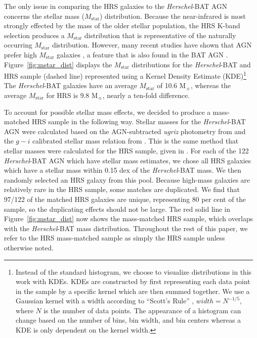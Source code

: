 \documentclass[fleqn, usenatbib]{mnras}
\newcommand{\herschel}{\emph{Herschel}}
\newcommand{\msun}{M$_{\sun}$}
\newcommand{\mstar}{$M_{\mathrm{star}}$}
\begin{document}
The only issue in comparing the HRS galaxies to the \herschel-BAT AGN concerns the stellar mass (\mstar) distribution. Because the near-infrared is most strongly effected by the mass of the older stellar population, the HRS K-band selection produces a \mstar{} distribution that is representative of the naturally occurring \mstar{} distribution. However, many recent studies have shown that AGN prefer high \mstar{} galaxies \citep[e.g.][]{Schawinski:2010zr,Xue:2010fj}, a feature that is also found in the BAT AGN \citep{Koss:2011vn}. Figure~\ref{fig:mstar_dist} displays the \mstar{} distributions for the \herschel-BAT and HRS sample (dashed line) represented using a Kernel Density Estimate (KDE)\footnote{Instead of the standard histogram, we choose to visualize distributions in this work with KDEs. KDEs are constructed by first representing each data point in the sample by a specific kernel which are then summed together. We use a Gaussian kernel with a width according to ``Scott's Rule''  \citep{Scott:1992xy}, $width=N^{-1/5}$, where $N$ is the number of data points. The appearance of a histogram can change based on the number of bins, bin width, and bin centers whereas a KDE is only dependent on the kernel width.} The \herschel-BAT galaxies have an average \mstar{} of 10.6 \msun, whereas the average \mstar{} for HRS is 9.8 \msun, nearly a ten-fold difference. 

To account for possible stellar mass effects, we decided to produce a mass-matched HRS sample in the following way. Stellar masses for the \herschel-BAT AGN were calculated based on the AGN-subtracted \textit{ugriz} photometry from \citet{Koss:2011vn} and the $g-i$ calibrated stellar mass relation from \citet{Zibetti:2009jf}. This is the same method that stellar masses were calculated for the HRS sample, given in \citet{Cortese:2012fj}. For each of the 122 \herschel-BAT AGN which have stellar mass estimates, we chose all HRS galaxies which have a stellar mass within 0.15 dex of the \herschel-BAT mass. We then randomly selected an HRS galaxy from this pool. Because high-mass galaxies are relatively rare in the HRS sample, some matches are duplicated. We find that 97/122 of the matched HRS galaxies are unique, representing 80 per cent of the sample, so the duplicating effects should not be large. The red solid line in Figure~\ref{fig:mstar_dist} now shows the mass-matched HRS sample, which overlaps with the \herschel-BAT mass distribution. Throughout the rest of this paper, we refer to the HRS mass-matched sample as simply the HRS sample unless otherwise noted.
 
\end{document}
